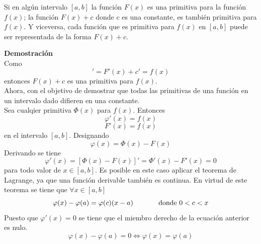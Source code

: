 \documentclass[10pt,twoside]{SelfArx} %
\begin{document}



 \begin{teorema}
 	Si en algún intervalo $ [a,b] $ la función $ F(x) $ es una primitiva para la función $ f(x) $; la función $ F(x)+c $ donde $ c $ es una constante, es también primitiva para $ f(x) $. Y viceversa, cada función que es primitiva para $ f(x) $ en $ [a,b] $ puede ser representada de la forma $ F(x)+c $.
 \end{teorema}
   \textbf{Demostración}\\
   Como 
   \begin{equation}
   [F(x)+c]'=F'(x)+c'=f(x)
   \end{equation}
   entonces  $ F(x)+c $ es una primitiva para $ f(x) $. \\
   Ahora, con el objetivo de demostrar que todas las primitivas de una función en un intervalo dado difieren en una constante.\\
   Sea cualqier primitiva $ \varPhi(x) $ para $ f(x) $. Entonces 
   \[ \varphi'(x)=f(x) \]
   \[ F'(x)=f(x) \]
   en el intervalo $ [a,b] $. Designando 
   \begin{equation}
   \varphi(x)=\varPhi(x)-F(x)
   \end{equation}
   Derivando se tiene 
   \begin{equation}
    \varphi'(x)=[\varPhi(x)-F(x)]'= \varPhi'(x)-F'(x)=0
   \end{equation}
   para todo valor de $ x\in[a,b] $.
   Es posible en este caso aplicar el teorema de Lagrange, ya que una función derivable también es continua. En virtud de este teorema se tiene que $ \forall x\in[a,b] $
   \begin{equation}
   \varphi(x)-\varphi(a)=\varphi(c)(x-a)\;\;\;\;\;\;\;\;\;\;\;\;\; \mbox{donde $ 0<c<x $}
   \end{equation}
   Puesto que $ \varphi'(x)=0 $ se tiene que el miembro derecho de la ecuación anterior es nulo.
   \begin{equation}
   \varphi(x)-\varphi(a)=0\Leftrightarrow\varphi(x)=\varphi(a)
   \end{equation}
\end{document}
